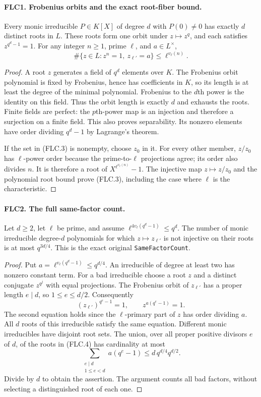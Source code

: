 \documentclass[11pt,a4paper]{article}
\numberwithin{equation}{section}
\theoremstyle{remark}\newtheorem{remark}[theorem]{Remark}
\begin{document}
\paragraph{FLC1. Frobenius orbits and the exact root-fiber bound.}
\label{claim:FLC1}
Every monic irreducible $P\in K[X]$ of degree $d$ with $P(0)\ne0$
has exactly $d$ distinct roots in $L$.  These roots form one orbit
under $z\mapsto z^q$, and each satisfies $z^{q^d-1}=1$.
For any integer $n\ge1$, prime $\ell$, and $a\in L^\times$,
\[
 \#\{z\in L:z^n=1,\ z_{\ell'}=a\}
                      \le\ell^{v_\ell(n)}.
 \tag{FLC.3}
\]
\begin{proof}
A root $z$ generates a field of $q^d$ elements over $K$.
The Frobenius orbit polynomial is fixed by Frobenius, hence has
coefficients in $K$, so its length is at least the degree of the
minimal polynomial.  Frobenius to the $d$th power is the identity
on this field.  Thus the orbit length is exactly $d$ and exhausts
the roots.  Finite fields are perfect: the $p$th-power map is an
injection and therefore a surjection on a finite field.  This also
proves separability.  Its nonzero elements have order dividing
$q^d-1$ by Lagrange's theorem.

If the set in (FLC.3) is nonempty, choose $z_0$ in it.
For every other member, $z/z_0$ has $\ell$-power order because the
prime-to-$\ell$ projections agree; its order also divides $n$.
It is therefore a root of $X^{\ell^{v_\ell(n)}}-1$.
The injective map $z\mapsto z/z_0$ and the polynomial root bound
prove (FLC.3), including the case where $\ell$ is the characteristic.
\end{proof}

\paragraph{FLC2. The full same-factor count.}
\label{claim:FLC2}
Let $d\ge2$, let $\ell$ be prime, and assume
$\ell^{4v_\ell(q^d-1)}\le q^d$.
The number of monic irreducible degree-$d$ polynomials for which
$z\mapsto z_{\ell'}$ is not injective on their roots is at most
$q^{3d/4}$.  This is the exact original \texttt{Same\allowbreak Factor\allowbreak Count}.
\begin{proof}
Put $a=\ell^{v_\ell(q^d-1)}\le q^{d/4}$.
An irreducible of degree at least two has nonzero constant term.
For a bad irreducible choose a root $z$ and a distinct conjugate
$z^{q^j}$ with equal projections.  The Frobenius orbit of
$z_{\ell'}$ has a proper length $e\mid d$, so $1\le e\le d/2$.
Consequently
\[
 (z_{\ell'})^{q^e-1}=1,\qquad z^{a(q^e-1)}=1.
 \tag{FLC.4}
\]
The second equation holds since the $\ell$-primary part of $z$
has order dividing $a$.  All $d$ roots of this irreducible
satisfy the same equation.  Different monic irreducibles have
disjoint root sets.  The union, over all proper positive divisors
$e$ of $d$, of the roots in (FLC.4) has cardinality at most
\[
 \sum_{\substack{e\mid d\\1\le e<d}} a(q^e-1)
                   \le d\,q^{d/4}q^{d/2}.
\]
Divide by $d$ to obtain the assertion.  The argument counts all
bad factors, without selecting a distinguished root of each one.
\end{proof}
\end{document}
